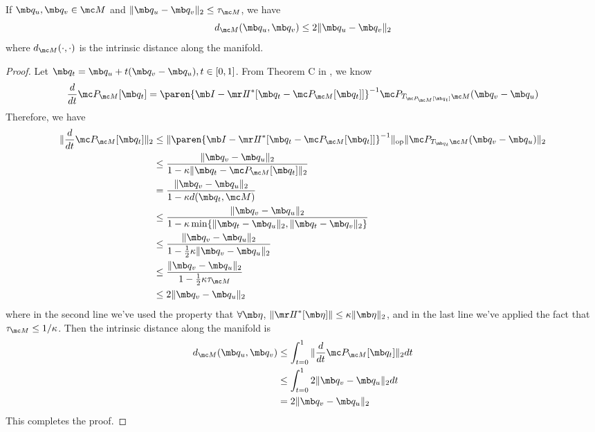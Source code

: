 \begin{lemma}\label{lem:intrinsic dist bounded by extrinsic dist}
     If $\mb q_u, \mb q_v \in \mc M$ and $\| \mb q_u - \mb q_v \|_2 \leq \tau_{\mc M}$, we have
    \begin{equation}
        d_{\mc M}(\mb q_u, \mb q_v) \leq 2 \| \mb q_u - \mb q_v \|_2
    \end{equation}
where $d_{\mc M}(\cdot,\cdot)$ is the intrinsic distance along the manifold.
\end{lemma}
\begin{proof}
    Let $\mb q_t = \mb q_u + t (\mb q_v - \mb q_u), t\in[0,1]$. From Theorem C in \cite{leobacher2021existence}, we know 
    \begin{equation}
        \frac{d}{dt} \mc P_{\mc M} [\mb q_t]=
        \paren{\mb I - \sff^*[\mb q_t - \mc P_{\mc M}[\mb q_t]]}^{-1}  \mc P_{T_{\mc P_{\mc M} [\mb q_t]} \mc M} (\mb q_v - \mb q_u) 
    \end{equation}
Therefore, we have
\begin{equation}
    \begin{aligned}
        \| \frac{d}{dt} \mc P_{\mc M} [\mb q_t] \|_2
        &\leq \| \paren{\mb I - \sff^*[\mb q_t - \mc P_{\mc M}[\mb q_t]]}^{-1} \|_{\text{op}} \| \mc P_{T_{\mb q_t} \mc M} (\mb q_v - \mb q_u)  \|_2\\
        &\leq \frac{\| \mb q_v - \mb q_u \|_2}{1-\kappa \|\mb q_t - \mc P_{\mc M}[\mb q_t] \|_2}\\
        &= \frac{\| \mb q_v - \mb q_u \|_2}{1-\kappa d(\mb q_t, \mc M)}\\
        &\leq \frac{\| \mb q_v - \mb q_u \|_2}{1-\kappa \min\{\| \mb q_t - \mb q_u\|_2, \| \mb q_t - \mb q_v \|_2\}}\\
        &\leq \frac{\| \mb q_v - \mb q_u \|_2}{1-\frac{1}{2} \kappa \| \mb q_v - \mb q_u \|_2}\\
        & \leq \frac{\| \mb q_v - \mb q_u \|_2}{1-\frac{1}{2} \kappa \tau_{\mc M}}\\
        &\leq 2 \| \mb q_v - \mb q_u\|_2
    \end{aligned}
\end{equation}
where in the second line we've used the property that $\forall \mb \eta$, $\| \sff^*[\mb \eta] \| \le \kappa \| \mb \eta \|_2$, and in the last line we've applied the fact that $\tau_{\mc M} \le 1/ \kappa$. 
Then the intrinsic distance along the manifold is 
\begin{equation}
    \begin{aligned}
        d_{\mc M}(\mb q_u, \mb q_v) 
        &\leq \int_{t=0}^1 \| \frac{d}{dt} \mc P_{\mc M} [\mb q_t] \|_2 dt\\
        &\leq \int_{t=0}^1 2\| \mb q_v - \mb q_u \|_2 dt\\
        &= 2\| \mb q_v - \mb q_u \|_2
    \end{aligned}
\end{equation}
This completes the proof.
\end{proof}






